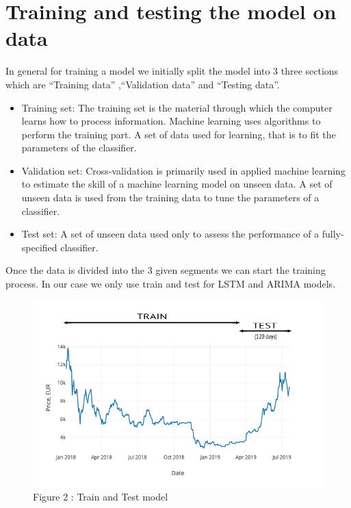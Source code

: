 \documentclass[11pt]{article}
\makeatletter
\def\maxwidth{\ifdim\Gin@nat@width>\linewidth\linewidth
    \else\Gin@nat@width\fi}
\let\Oldincludegraphics\includegraphics
\renewcommand{\includegraphics}[1]{\Oldincludegraphics[width=.8\maxwidth]{#1}}
\providecommand{\tightlist}{%
      \setlength{\itemsep}{0pt}\setlength{\parskip}{0pt}}
\makeatother
\begin{document}
    \hypertarget{training-and-testing-the-model-on-data}{%
\section{Training and testing the model on
data}\label{training-and-testing-the-model-on-data}}

    In general for training a model we initially split the model into 3
three sections which are ``Training data'' ,``Validation data'' and
``Testing data''.

\begin{itemize}
\tightlist
\item
  Training set: The training set is the material through which the
  computer learns how to process information. Machine learning uses
  algorithms to perform the training part. A set of data used for
  learning, that is to fit the parameters of the classifier.
\item
  Validation set: Cross-validation is primarily used in applied machine
  learning to estimate the skill of a machine learning model on unseen
  data. A set of unseen data is used from the training data to tune the
  parameters of a classifier.
\item
  Test set: A set of unseen data used only to assess the performance of
  a fully-specified classifier.
\end{itemize}

    Once the data is divided into the 3 given segments we can start the
training process. In our case we only use train and test for LSTM and
ARIMA models.

\begin{figure}[H]
	\centering
		\includegraphics{traintest.png}
		  \caption{Figure 2 : Train and Test model}
\end{figure} 
\end{document}
